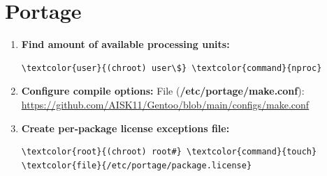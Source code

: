 \documentclass[10pt, a4paper, onecolumn, oneside, titlepage, openany]{book}
\begin{document}
\section{Portage}
\begin{enumerate}
    \item \textbf{Find amount of available processing units:}
\begin{Verbatim}[commandchars=\\\{\}]
\textcolor{user}{(chroot) user\$} \textcolor{command}{nproc}
\end{Verbatim}
    \item \textbf{Configure compile options:}
\newline File (\textbf{\textcolor{file}{/etc/portage/make.conf}}):
\newline \url{https://github.com/AISK11/Gentoo/blob/main/configs/make.conf}
    \item \textbf{Create per-package license exceptions file:}
\begin{Verbatim}[commandchars=\\\{\}]
\textcolor{root}{(chroot) root#} \textcolor{command}{touch} \textcolor{file}{/etc/portage/package.license}
\end{Verbatim}
\end{enumerate}
\end{document}
